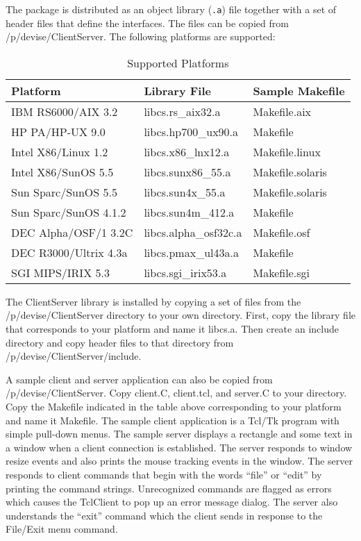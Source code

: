 The package is distributed as an object library ({\tt .a}) file
together with a set of header files that define the interfaces. The
files can be copied from /p/devise/ClientServer. The following
platforms are supported:

\begin{table}[h]
\centering
\caption{Supported Platforms}
\bigskip
\begin{tabular}{lll}
Platform & Library File & Sample Makefile \\
\hline
IBM RS6000/AIX 3.2    & libcs.rs\_aix32.a     & Makefile.aix \\
HP PA/HP-UX 9.0       & libcs.hp700\_ux90.a   & Makefile \\
Intel X86/Linux 1.2   & libcs.x86\_lnx12.a    & Makefile.linux \\
Intel X86/SunOS 5.5   & libcs.sunx86\_55.a    & Makefile.solaris \\
Sun Sparc/SunOS 5.5   & libcs.sun4x\_55.a     & Makefile.solaris \\
Sun Sparc/SunOS 4.1.2 & libcs.sun4m\_412.a    & Makefile \\
DEC Alpha/OSF/1 3.2C  & libcs.alpha\_osf32c.a & Makefile.osf \\
DEC R3000/Ultrix 4.3a & libcs.pmax\_ul43a.a   & Makefile \\
SGI MIPS/IRIX 5.3     & libcs.sgi\_irix53.a   & Makefile.sgi
\end{tabular}
\end{table}

The ClientServer library is installed by copying a set of files from
the /p/devise/ClientServer directory to your own directory. First,
copy the library file that corresponds to your platform and name it
libcs.a. Then create an include directory and copy header files to
that directory from /p/devise/ClientServer/include.

A sample client and server application can also be copied from
/p/devise/ClientServer. Copy client.C, client.tcl, and server.C to
your directory. Copy the Makefile indicated in the table above
corresponding to your platform and name it Makefile. The sample client
application is a Tcl/Tk program with simple pull-down menus. The
sample server displays a rectangle and some text in a window when a
client connection is established. The server responds to window resize
events and also prints the mouse tracking events in the window. The
server responds to client commands that begin with the words ``file''
or ``edit'' by printing the command strings.  Unrecognized commands
are flagged as errors which causes the TclClient to pop up an error
message dialog. The server also understands the ``exit'' command which
the client sends in response to the File/Exit menu command.

